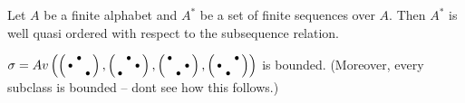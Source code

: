 \begin{fct}
\label{Higman}
Let $A$ be a finite alphabet and $A^*$ be a set of finite sequences over $A$. Then $A^*$ is well quasi ordered with respect to the subsequence relation.
\end{fct}
\begin{thm}
$\sigma=Av\left(\left(\begin{smallmatrix} &\bullet& \\\bullet& & \\ & &\bullet\end{smallmatrix}\right),\left(\begin{smallmatrix} &\bullet& \\ & &\bullet\\\bullet& & \end{smallmatrix}\right),\left(\begin{smallmatrix}\bullet& & \\ & &\bullet\\ &\bullet& \end{smallmatrix}\right),\left(\begin{smallmatrix} & &\bullet\\\bullet& & \\ &\bullet& \end{smallmatrix}\right)\right)$ is bounded. (Moreover, every subclass is bounded -- dont see how this follows.)
\end{thm}
